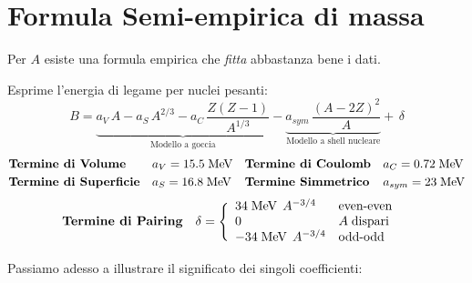 \section{Formula Semi-empirica di massa}
Per $A$  esiste una formula empirica che \textit{fitta} abbastanza bene i dati.
\begin{definition}
Esprime l'energia di legame per nuclei pesanti:
$$B = \underbrace{a_V \, A - a_S\, A^{2/3} - a_C \, \frac{Z(Z-1)}{A^{1/3}}}_\text{Modello a goccia} %
- \underbrace{a_{sym} \, \frac{(A-2Z)^2}{A}}_\text{Modello a shell nucleare} %
+\, \delta$$
\begin{displaymath}
\begin{aligned}
&\text{\textbf{Termine di Volume}} & &a_V = 15.5\;\mbox{MeV} & &\text{\textbf{Termine di Coulomb}} & &a_C = 0.72\;\mbox{MeV}\\
&\text{\textbf{Termine di Superficie}} & &a_S = 16.8\;\mbox{MeV} & &\text{\textbf{Termine Simmetrico}} & &a_{sym} = 23\;\mbox{MeV}\\
\end{aligned}
\end{displaymath}
\begin{displaymath}
\begin{aligned}
&\text{\textbf{Termine di Pairing}} & &\delta = \Biggl \{ 
\begin{array}{ll}
    34\;\mbox{MeV}\;\, A^{-3/4} &  \text{even-even}\\
    0 &  A\; \text{dispari}\\
    -34\;\mbox{MeV}\;\, A^{-3/4} & \text{odd-odd}
\end{array}
\end{aligned}
\end{displaymath}
\end{definition}
Passiamo adesso a illustrare il significato dei singoli coefficienti:
